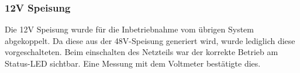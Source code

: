 \subsubsection{12V Speisung}
\label{subsubsec:Inbetriebnahme_12V_Speisungen}

Die 12V Speisung wurde für die Inbetriebnahme vom übrigen System abgekoppelt. Da diese aus der 48V-Speisung generiert wird, wurde lediglich diese vorgeschalteten. Beim einschalten des Netzteils war der korrekte Betrieb am Status-LED sichtbar. Eine Messung mit dem Voltmeter bestätigte dies. 

